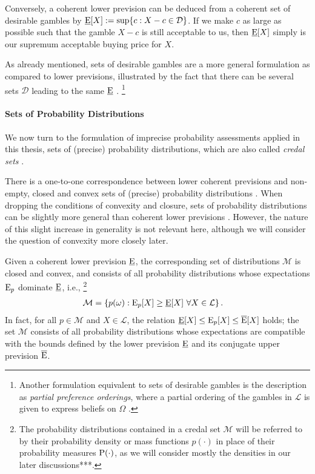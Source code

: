 Conversely, a coherent lower prevision can be deduced from a coherent set of desirable gambles by
$\underline{\operatorname{E}}[X] := \sup\{c: X - c \in \mathcal{D}\}$.
If we make $c$ as large as possible such that the gamble $X-c$ is still acceptable to us,
then $\underline{\operatorname{E}}[X]$ simply is our supremum acceptable buying price for $X$.

As already mentioned, sets of desirable gambles are a more general formulation
as compared to lower previsions, illustrated by the fact that there can be
several sets $\mathcal{D}$ leading to the same $\underline{\operatorname{E}}$ \parencite[p.~139]{2000:walley::towards}.%
\footnote{Another formulation equivalent to sets of desirable gambles is the description as \emph{partial preference orderings},
where a partial ordering of the gambles in $\mathcal{L}$ is given to express beliefs on $\Omega$
\parencite[p.~138]{2000:walley::towards}.}

\paragraph{Sets of Probability Distributions}

We now turn to the formulation of imprecise probability assessments
applied in this thesis, 
sets of (precise) probability distributions,
which are also called \emph{credal sets} \parencite[e.g.,][p.~136]{2000:walley::towards}.

There is a one-to-one correspondence between lower coherent previsions
and non-empty, closed and convex sets of (precise) probability distributions
\parencite[\S 3.6.1]{1991:walley}.
When dropping the conditions of convexity and closure,
sets of probability distributions can be slightly more general
than coherent lower previsions \parencite[\S 5]{2000:walley::towards}.
However, the nature of this slight increase in generality is not relevant here,
although we will consider the question of convexity more closely later.

Given a coherent lower prevision $\underline{\operatorname{E}}$,
the corresponding set of distributions $\mathcal{M}$
is closed and convex, and consists of all probability distributions
whose expectations $\operatorname{E}_p$ dominate $\underline{\operatorname{E}}$, i.e.,%
\footnote{The probability distributions contained in a credal set $\mathcal{M}$
will be referred to by their probability density or mass functions $p(\cdot)$
in place of their probability measures $\operatorname{P}(\cdot)$, as we will consider mostly the densities
in our later discussions***.}
\begin{align*}
\mathcal{M} &= \{ p(\omega) : \operatorname{E}_p[X] \ge \underline{\operatorname{E}}[X]\ \forall X \in \mathcal{L}\}\,.
\end{align*}
In fact, for all $p \in \mathcal{M}$ and $X \in \mathcal{L}$,
the relation $\underline{\operatorname{E}}[X] \le \operatorname{E}_p[X] \le \overline{\operatorname{E}}[X]$ holds;
the set $\mathcal{M}$ consists of all probability distributions
whose expectations are compatible with the bounds defined by
the lower prevision $\underline{\operatorname{E}}$ and its conjugate upper prevision $\overline{\operatorname{E}}$.

